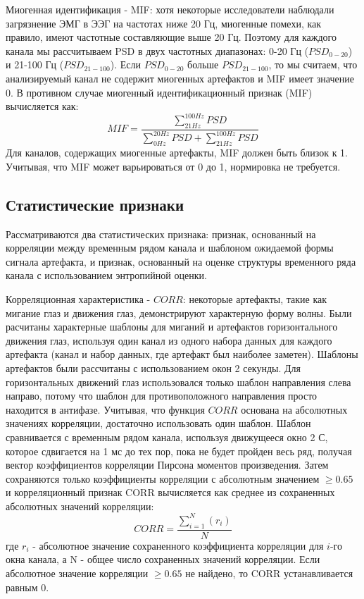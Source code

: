 \documentclass[12pt, a4paper, titlepage]{extreport}
\begin{document}
	Миогенная идентификация - MIF: хотя некоторые исследователи наблюдали загрязнение ЭМГ в ЭЭГ на частотах ниже 20 Гц, миогенные помехи, как правило, имеют частотные составляющие выше 20 Гц. Поэтому для каждого канала мы рассчитываем PSD в двух частотных диапазонах: 0-20 Гц ($PSD_{0-20}$) и 21-100 Гц ($PSD_{21-100}$).
	Если $PSD_{0-20}$ больше $PSD_{21-100}$, то мы считаем, что анализируемый канал не содержит миогенных артефактов и MIF имеет значение 0. В противном случае миогенный идентификационный признак (MIF) вычисляется как:
	$$
	MIF=\frac{\sum_{21Hz}^{100Hz}PSD}{\sum_{0Hz}^{20Hz}PSD + \sum_{21Hz}^{100Hz}PSD}
	$$
	Для каналов, содержащих миогенные артефакты, MIF должен быть близок к 1. Учитывая, что MIF может варьироваться от 0 до 1, нормировка не требуется.
	\subsection*{Статистические признаки}
	Рассматриваются два статистических признака: признак, основанный на корреляции между временным рядом канала и шаблоном ожидаемой формы сигнала артефакта, и признак, основанный на оценке структуры временного ряда канала с использованием энтропийной оценки.
	
	Корреляционная характеристика - $CORR$: некоторые артефакты, такие как мигание глаз и движения глаз, демонстрируют характерную форму волны. Были расчитаны характерные шаблоны для миганий и артефактов горизонтального движения глаз, используя один канал из одного набора данных для каждого артефакта (канал и набор данных, где артефакт был наиболее заметен). Шаблоны артефактов были рассчитаны с использованием окон 2 секунды. Для горизонтальных движений глаз использовался только шаблон направления слева направо, потому что шаблон для противоположного направления просто находится в антифазе. Учитывая, что функция  $CORR$ основана на абсолютных значениях корреляции, достаточно использовать один шаблон. Шаблон сравнивается с временным рядом канала, используя движущееся окно 2 С, которое сдвигается на 1 мс до тех пор, пока не будет пройден весь ряд, получая вектор коэффициентов корреляции Пирсона моментов произведения. Затем сохраняются только коэффициенты корреляции с абсолютным значением $\ge 0.65$ и корреляционный признак CORR вычисляется как среднее из сохраненных абсолютных значений корреляции:
	$$
	CORR = \frac{\sum_{i=1}^{N}(r_i)}{N}
	$$
	где $r_i$ - абсолютное значение сохраненного коэффициента корреляции для $i$-го окна канала, а N - общее число сохраненных значений корреляции. Если абсолютное значение корреляции $\ge 0.65$ не найдено, то CORR устанавливается равным 0.
	
\end{document}
